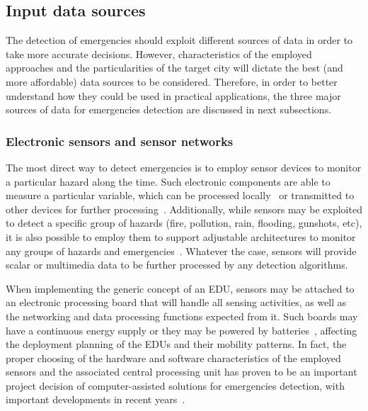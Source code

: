 \begin{refsection}
\subsection{Input data sources}

The detection of emergencies should exploit different sources of data in order to take more accurate decisions. However, characteristics of the employed approaches and the particularities of the target city will dictate the best (and more affordable) data sources to be considered. Therefore, in order to better understand how they could be used in practical applications, the three major sources of data for emergencies detection are discussed in next subsections.

\subsubsection{Electronic sensors and sensor networks}

The most direct way to detect emergencies is to employ sensor devices to monitor a particular hazard along the time. Such electronic components are able to measure a particular variable, which can be processed locally~\cite{edge1} or transmitted to other devices for further processing~\cite{iotRain1}. Additionally, while sensors may be exploited to detect a specific group of hazards (fire, pollution, rain, flooding, gunshots, etc), it is also possible to employ them to support adjustable architectures to monitor any groups of hazards and emergencies~\cite{emergenciesmetric2,emergenciesmetric4,emergenciesmetric6,emergenciesmetric5}. Whatever the case, sensors will provide scalar or multimedia data to be further processed by any detection algorithms.

When implementing the generic concept of an EDU, sensors may be attached to an electronic processing board that will handle all sensing activities, as well as the networking and data processing functions expected from it. Such boards may have a continuous energy supply or they may be powered by batteries~\cite{energy1}, affecting the deployment planning of the EDUs and their mobility patterns. In fact, the proper choosing of the hardware and software characteristics of the employed sensors and the associated central processing unit has proven to be an important project decision of computer-assisted solutions for emergencies detection, with important developments in recent years~\cite{sensorsplatforms,sensorsplatforms2,sensorsplatforms3}.


\end{refsection}
